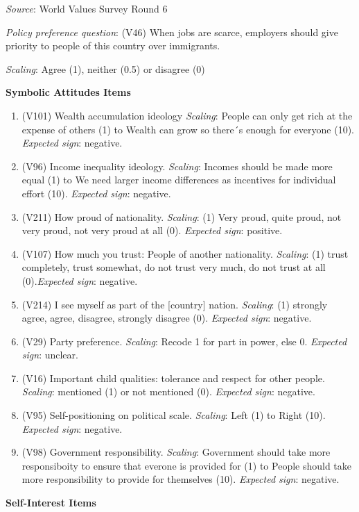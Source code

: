 \documentclass[]{article}
\begin{document}
\textit{Source}: World Values Survey Round 6

\textit{Policy preference question}: (V46) When jobs are scarce,
employers should give priority to people of this country over
immigrants.

\textit{Scaling}: Agree (1), neither (0.5) or disagree (0)

\textbf{Symbolic Attitudes Items}

\begin{enumerate}
  \item (V101) Wealth accumulation ideology \textit{Scaling}: People can only get rich at the expense of others (1) to Wealth can grow so there´s enough for everyone (10).  \textit{Expected sign}: negative.
  \item (V96) Income inequality ideology. \textit{Scaling}: Incomes should be made more equal (1) to We need larger income differences as incentives for individual effort (10). \textit{Expected sign}: negative.
  \item (V211) How proud of nationality. \textit{Scaling}: (1) Very proud, quite proud, not very proud, not very proud at all (0). \textit{Expected sign}: positive. 
  \item (V107) How much you trust: People of another nationality. \textit{Scaling}: (1) trust completely, trust somewhat, do not trust very much, do not trust at all (0).\textit{Expected sign}: negative.
  \item (V214) I see myself as part of the [country] nation. \textit{Scaling}: (1) strongly agree, agree, disagree, strongly disagree (0). \textit{Expected sign}: negative.
  \item (V29) Party preference. \textit{Scaling}: Recode 1 for part in power, else 0. \textit{Expected sign}: unclear.
  \item (V16) Important child qualities: tolerance and respect for other people. \textit{Scaling}: mentioned (1) or not mentioned (0). \textit{Expected sign}: negative.
  \item (V95) Self-positioning on political scale. \textit{Scaling}: Left (1) to Right (10). \textit{Expected sign}: negative.
  \item (V98) Government responsibility. \textit{Scaling}: Government should take more responsiboity to ensure that everone is provided for (1) to People should take more responsibility to provide for themselves (10). \textit{Expected sign}: negative.
\end{enumerate}

\textbf{Self-Interest Items}
\end{document}
